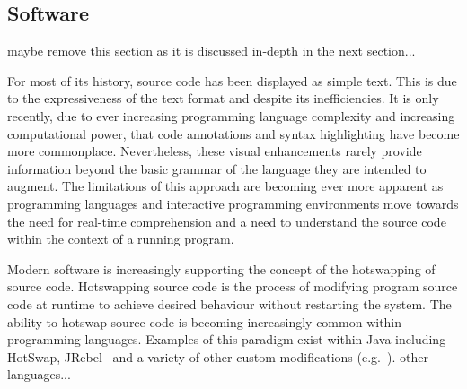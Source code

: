 


\subsection{Software}
{\color{red} maybe remove this section as it is discussed in-depth in the next section...}

For most of its history, source code has been displayed as simple text. This is due to the expressiveness of the text format and despite its inefficiencies. It is only recently, due to ever increasing programming language complexity and increasing computational power, that code annotations and syntax highlighting have become more commonplace. Nevertheless, these visual enhancements rarely provide information beyond the basic grammar of the language they are intended to augment. The limitations of this approach are becoming ever more apparent as programming languages and interactive programming environments move towards the need for real-time comprehension and a need to understand the source code within the context of a running program.


Modern software is increasingly supporting the concept of the hotswapping of source code. Hotswapping source code is the process of modifying program source code at runtime to achieve desired behaviour without restarting the system. The ability to hotswap source code is becoming increasingly common within programming languages. Examples of this paradigm exist within Java including HotSwap, JRebel~\cite{ZeroTurnaround2014} and a variety of other custom modifications (e.g.~\cite{Thomas2011}). {\color{red} other languages...}

